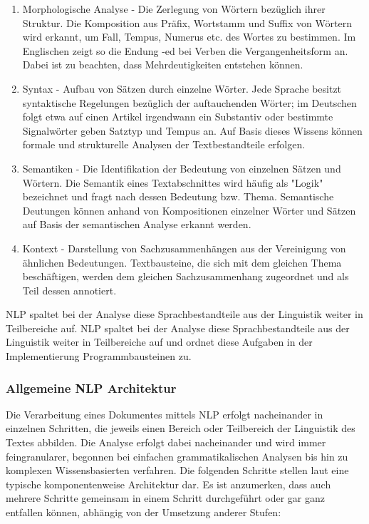 \documentclass[12pt]{paper}
\begin{document}
\begin{enumerate}
\item
Morphologische Analyse - Die Zerlegung von Wörtern bezüglich ihrer Struktur. Die Komposition aus Präfix, Wortstamm und Suffix von Wörtern wird erkannt, um Fall, Tempus, Numerus etc. des Wortes zu bestimmen. Im Englischen zeigt so die Endung -ed bei Verben die Vergangenheitsform an. Dabei ist zu beachten, dass Mehrdeutigkeiten entstehen können.
\item
Syntax - Aufbau von Sätzen durch einzelne Wörter. Jede Sprache besitzt syntaktische Regelungen bezüglich der auftauchenden Wörter; im Deutschen folgt etwa auf einen Artikel irgendwann ein Substantiv oder bestimmte Signalwörter geben Satztyp und Tempus an. Auf Basis dieses Wissens können formale und strukturelle Analysen der Textbestandteile erfolgen.
\item
Semantiken - Die Identifikation der Bedeutung von einzelnen Sätzen und Wörtern. Die Semantik eines Textabschnittes wird häufig als "Logik" bezeichnet und fragt nach dessen Bedeutung bzw. Thema. Semantische Deutungen können anhand von Kompositionen einzelner Wörter und Sätzen auf Basis der semantischen Analyse erkannt werden.
\item
Kontext - Darstellung von Sachzusammenhängen aus der Vereinigung von ähnlichen Bedeutungen. Textbausteine, die sich mit dem gleichen Thema beschäftigen, werden dem gleichen Sachzusammenhang zugeordnet und als Teil dessen annotiert.
\end{enumerate}

NLP spaltet bei der Analyse diese Sprachbestandteile aus der Linguistik weiter in Teilbereiche auf.
NLP spaltet bei der Analyse diese Sprachbestandteile aus der Linguistik weiter in Teilbereiche auf und ordnet diese Aufgaben in der Implementierung Programmbausteinen zu.

\subsubsection{Allgemeine NLP Architektur}
Die Verarbeitung eines Dokumentes mittels NLP erfolgt nacheinander in einzelnen Schritten, die jeweils einen Bereich oder Teilbereich der Linguistik des Textes abbilden. Die Analyse erfolgt dabei nacheinander und wird immer feingranularer, begonnen bei einfachen grammatikalischen Analysen bis hin zu komplexen Wissensbasierten verfahren. Die folgenden Schritte stellen laut \cite{cop04} eine typische komponentenweise Architektur dar. Es ist anzumerken, dass auch mehrere Schritte gemeinsam in einem Schritt durchgeführt oder gar ganz entfallen können, abhängig von der Umsetzung anderer Stufen:
\end{document}

